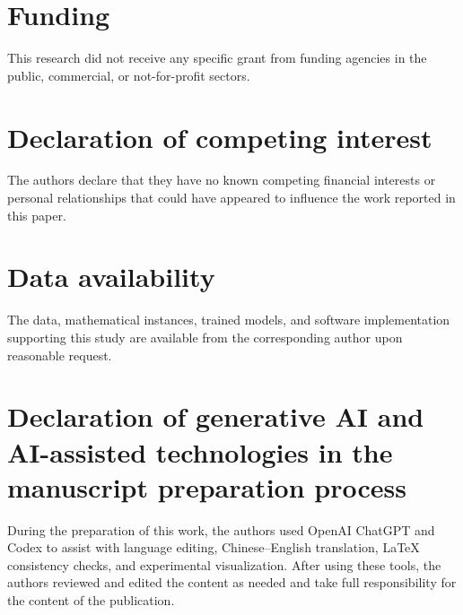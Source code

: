 \documentclass[final,5p,times,twocolumn]{elsarticle}
\begin{document}
\section*{Funding}
This research did not receive any specific grant from funding agencies in the public, commercial, or not-for-profit sectors.

\section*{Declaration of competing interest}
The authors declare that they have no known competing financial interests or personal relationships that could have appeared to influence the work reported in this paper.

\section*{Data availability}
The data, mathematical instances, trained models, and software implementation supporting this study are available from the corresponding author upon reasonable request.

\section*{Declaration of generative AI and AI-assisted technologies in the manuscript preparation process}
During the preparation of this work, the authors used OpenAI ChatGPT and Codex to assist with language editing, Chinese--English translation, LaTeX consistency checks, and experimental visualization. After using these tools, the authors reviewed and edited the content as needed and take full responsibility for the content of the publication.
\end{document}
